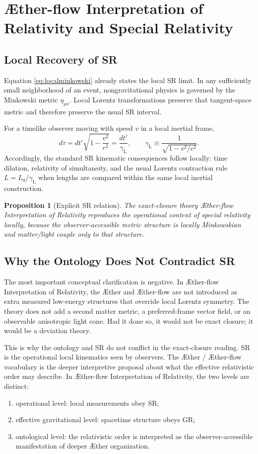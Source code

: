 \documentclass[11pt]{article}
\newcommand{\Aether}{\AE{}ther}
\newcommand{\Aflow}{\AE{}ther-flow}
\newcommand{\TheoryName}{\Aflow{} Interpretation of Relativity}
\newcommand{\Lor}{\gamma_{\mathrm{L}}}
\newtheorem{proposition}{Proposition}
\begin{document}
\section{\TheoryName{} and Special Relativity}

\subsection{Local Recovery of SR}

Equation \eqref{eq:localminkowski} already states the local SR limit. In any sufficiently small neighborhood of an event, nongravitational physics is governed by the Minkowski metric \(\eta_{\mu\nu}\). Local Lorentz transformations preserve that tangent-space metric and therefore preserve the usual SR interval.

For a timelike observer moving with speed \(v\) in a local inertial frame,
\begin{equation}
d\tau
=
dt'\sqrt{1-\frac{v^2}{c^2}}
=
\frac{dt'}{\Lor},
\qquad
\Lor\equiv \frac{1}{\sqrt{1-v^2/c^2}}.
\label{eq:kinematictimedilation}
\end{equation}
Accordingly, the standard SR kinematic consequences follow locally: time dilation, relativity of simultaneity, and the usual Lorentz contraction rule \(L=L_0/\Lor\) when lengths are compared within the same local inertial construction.

\begin{proposition}[Explicit SR relation]
The exact-closure theory \TheoryName{} reproduces the operational content of special relativity locally, because the observer-accessible metric structure is locally Minkowskian and matter/light couple only to that structure.
\end{proposition}

\subsection{Why the Ontology Does Not Contradict SR}

The most important conceptual clarification is negative. In \TheoryName{}, the \Aether{} and \Aflow{} are not introduced as extra measured low-energy structures that override local Lorentz symmetry. The theory does not add a second matter metric, a preferred-frame vector field, or an observable anisotropic light cone. Had it done so, it would not be exact closure; it would be a deviation theory.

This is why the ontology and SR do not conflict in the exact-closure reading. SR is the operational local kinematics seen by observers. The \Aether{} / \Aflow{} vocabulary is the deeper interpretive proposal about what the effective relativistic order may describe. In \TheoryName{}, the two levels are distinct:
\begin{enumerate}
    \item operational level: local measurements obey SR;
    \item effective gravitational level: spacetime structure obeys GR;
    \item ontological level: the relativistic order is interpreted as the observer-accessible manifestation of deeper \Aether{} organization.
\end{enumerate}
\end{document}
